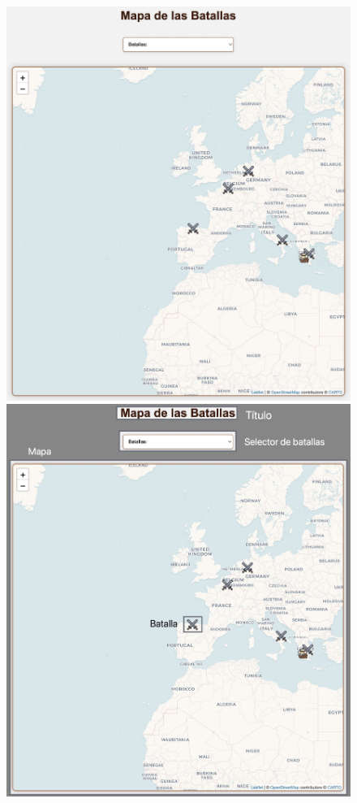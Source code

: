 \documentclass{article}
\begin{document}
\begin{figure}[H]
    \centering
    \begin{minipage}{0.49\textwidth}
        \includegraphics[width=\linewidth]{htmlFotos/mapa.jpg}
    \end{minipage}\hfill
    \begin{minipage}{0.49\textwidth}
        \includegraphics[width=\linewidth]{htmlFotos/prototipoMapa.jpg}
    \end{minipage}
    

\end{figure}
\end{document}
